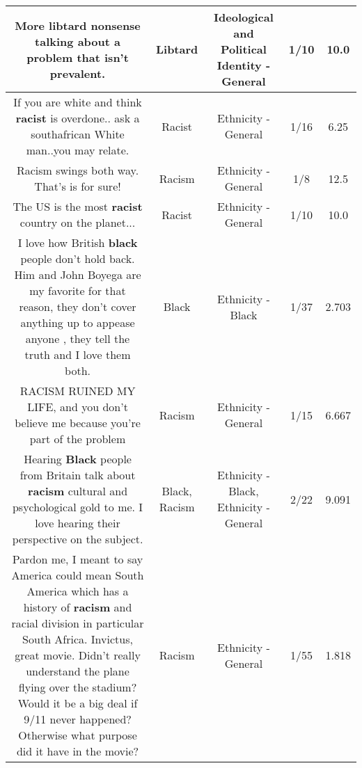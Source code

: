 \documentclass[11pt]{article}
\newlength\mylength
\begin{document}
\begin{center}
\begin{longtable}{|C{.65\mylength}|C{.30\mylength}|C{.12\mylength}|C{.12\mylength}|C{.12\mylength}|}
  \small More \textbf{libtard} nonsense talking about a problem that isn't prevalent.\normalsize   & Libtard &  Ideological and Political Identity - General & 1/10 & 10.0 \\  \hline
  \small If you are white and think \textbf{racist} is overdone.. ask a southafrican White man..you may relate.\normalsize   & Racist & Ethnicity - General & 1/16 & 6.25 \\  \hline
  \small Racism swings both way. That's is for sure!\normalsize   & Racism & Ethnicity - General & 1/8 & 12.5 \\  \hline
  \small The US is the most \textbf{racist} country on the planet...\normalsize   & Racist & Ethnicity - General & 1/10 & 10.0 \\  \hline
  \small I love how British \textbf{black} people don't hold back. Him and John Boyega are my favorite for that reason, they don't cover anything up to appease anyone , they tell the truth and I love them both.\normalsize   & Black & Ethnicity - Black & 1/37 & 2.703 \\  \hline
  \small RACISM RUINED MY LIFE, and you don't believe me because you're part of the problem\normalsize   & Racism & Ethnicity - General & 1/15 & 6.667 \\  \hline
  \small Hearing \textbf{Black} people from Britain talk about \textbf{racism} cultural and psychological gold to me. I love hearing their perspective on the subject.\normalsize   & Black, Racism & Ethnicity - Black, Ethnicity - General & 2/22 & 9.091 \\  \hline
  \small Pardon me, I meant to say America could mean South America which has a history of \textbf{racism} and racial division in particular South Africa. Invictus, great movie. Didn't really understand the plane flying over the stadium? Would it be a big deal if 9/11 never happened? Otherwise what purpose did it have in the movie?\normalsize   & Racism & Ethnicity - General & 1/55 & 1.818 \\  \hline

\end{longtable}
\end{center}
\end{document}
